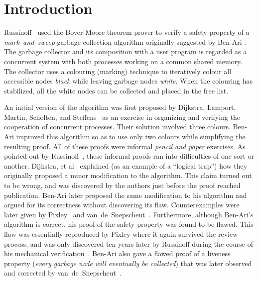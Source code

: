          
\section{Introduction}

Russinoff~\cite{Rus:GC} used   the Boyer-Moore theorem prover  to
verify  a  safety  property   of   a {\em  mark--and--sweep}   garbage
collection  algorithm originally suggested  by Ben-Ari \cite{Ben:GC}. 
The garbage collector and   its composition with   a user  program  is
regarded as a concurrent system with both processes working on
a common shared memory.  The  collector uses a colouring  (marking) technique
to iteratively colour all accessible nodes {\em black} while 
leaving garbage nodes {\em white}.  When the colouring has
stabilized, all the white nodes can be collected and placed in the
free list.

An initial  version of the algorithm  was  first proposed by Dijkstra,
Lamport, Martin, Scholten, and Steffens~\cite{DLMSS:GC} as an exercise
in  organizing and verifying the cooperation  of concurrent processes. 
Their solution   involved   three  colours.   Ben-Ari    improved this
algorithm so  as  to use    only  two colours  while  simplifying  the
resulting proof.  All of these  proofs were  informal {\em pencil  and
  paper\/} exercises.  As   pointed  out by   Russinoff~\cite{Rus:GC},
these informal proofs  ran into difficulties  of one sort or  another. 
Dijkstra, et al~\cite{DLMSS:GC}    explained   (as an  example  of   a
``logical trap'') how they originally proposed a minor modification to
the  algorithm.   This claim turned   out  to   be  wrong, and  was
discovered by the authors just  before the proof reached publication.  
Ben-Ari  later  proposed the same  modification   to his algorithm and
argued for   its    correctness   without  discovering its       flaw. 
Counterexamples    were  later  given    by  Pixley~\cite{Pix:GC}  and
van~de~Snepscheut~\cite{Van:GC}.   Furthermore,  although    Ben-Ari's
algorithm 
is correct, his proof of
the safety property was found to be flawed.  This flaw was essentially
reproduced by Pixley \cite{Pix:GC} where it  again survived the  review
process, and was only discovered  ten years later by Russinoff  during
the course of his mechanical verification~\cite{Rus:GC}.  Ben-Ari also
gave a flawed  proof of a liveness  property ({\em every garbage  node
  will eventually be collected}) that was later observed and corrected
by van~de~Snepscheut~\cite{Van:GC}.

